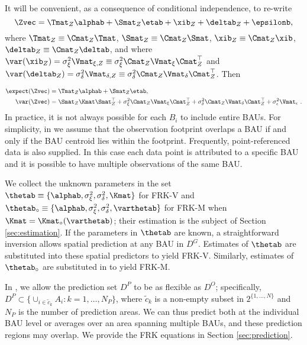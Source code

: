 

It will be convenient, as a consequence of conditional independence, to re-write
\begin{equation}\label{eq:Z_collapsed}
\Zvec = \Tmat_Z\alphab + \Smat_Z\etab + \xib_Z + \deltab_Z + \epsilonb,
\end{equation}
where $\Tmat_Z \equiv \Cmat_Z \Tmat$, $\Smat_Z \equiv \Cmat_Z \Smat$, $\xib_Z \equiv \Cmat_Z \xib$, $\deltab_Z \equiv \Cmat_Z \deltab$, and where $\var(\xib_Z) = \sigma^2_\xi\Vmat_{\xi,Z} \equiv \sigma^2_\xi\Cmat_Z\Vmat_{\xi}\Cmat_Z^\top$ and $\var(\deltab_Z) = \sigma^2_\delta\Vmat_{\delta,Z} \equiv \sigma^2_\delta\Cmat_Z\Vmat_\delta\Cmat_Z^\top$. Then

\begin{align*}
\expect(\Zvec) &=\Tmat_Z\alphab + \Smat_Z\etab,\\
\var(\Zvec) &= \Smat_Z\Kmat\Smat_Z^\top + \sigma^2_\xi\Cmat_Z\Vmat_{\xi}\Cmat_Z^\top +  \sigma^2_\delta\Cmat_Z\Vmat_\delta\Cmat_Z^\top + \sigma^2_\epsilon\Vmat_\epsilon~.
\end{align*}
In practice, it is not always possible for each $B_i$ to include entire BAUs. For simplicity, in  we assume that the observation footprint overlaps a BAU if and only if the BAU centroid lies within the footprint. Frequently, point-referenced data is also supplied. In this case each data point is attributed to a specific BAU and it is possible to have multiple observations of the same BAU.


We collect the unknown parameters in the set $\thetab \equiv \{\alphab, \sigma^2_\xi, \sigma^2_\delta, \Kmat\}$ for FRK-V and $\thetab_\circ \equiv \{\alphab, \sigma^2_\xi, \sigma^2_\delta, \varthetab\}$ for FRK-M when $\Kmat = \Kmat_\circ(\varthetab)$; their estimation is the subject of Section \ref{sec:estimation}. If the parameters in $\thetab$ are known, a straightforward inversion allows spatial prediction at any BAU in $D^G$. Estimates of $\thetab$ are substituted into these spatial predictors to yield FRK-V. Similarly, estimates of $\thetab_\circ$ are substituted in to yield FRK-M.

In , we allow the prediction set $D^P$ to be as flexible as $D^O$; specifically, $D^P \subset \{ \cup_{i \in \tilde{c}_k} A_i : k = 1,\dots,N_P \}$, where $\tilde{c}_k$ is a non-empty subset in $2^{\{1,\dots,N\}}$ and $N_P$ is the number of prediction areas. We can thus predict both at the individual BAU level or averages over an area spanning multiple BAUs, and these prediction regions may overlap. We provide the FRK equations in Section \ref{sec:prediction}.


